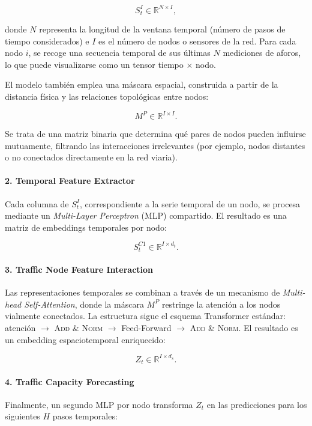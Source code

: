 \[
S_t^{I}\in\mathbb{R}^{N\times I},
\]

donde $N$ representa la longitud de la ventana temporal (número de pasos de tiempo considerados) e $I$ es el número de nodos o sensores de la red. Para cada nodo $i$, se recoge una secuencia temporal de sus últimas $N$ mediciones de aforos, lo que puede visualizarse como un tensor tiempo × nodo.

El modelo también emplea una máscara espacial, construida a partir de la distancia física y las relaciones topológicas entre nodos:

\[
M^{P}\in\mathbb{R}^{I\times I}.
\]

Se trata de una matriz binaria que determina qué pares de nodos pueden influirse mutuamente, filtrando las interacciones irrelevantes (por ejemplo, nodos distantes o no conectados directamente en la red viaria).

\paragraph*{2. Temporal Feature Extractor}  

Cada columna de $S_t^{I}$, correspondiente a la serie temporal de un nodo, se procesa mediante un \emph{Multi-Layer Perceptron} (MLP) compartido. El resultado es una matriz de embeddings temporales por nodo:

\[
S_t^{C1}\in\mathbb{R}^{I\times d_t}.
\]

\paragraph*{3. Traffic Node Feature Interaction}  

Las representaciones temporales se combinan a través de un mecanismo de \emph{Multi-head Self-Attention}, donde la máscara $M^{P}$ restringe la atención a los nodos vialmente conectados. La estructura sigue el esquema Transformer estándar: atención $\rightarrow$ \textsc{Add \& Norm} $\rightarrow$ Feed-Forward $\rightarrow$ \textsc{Add \& Norm}. El resultado es un embedding espaciotemporal enriquecido:

\[
Z_t\in\mathbb{R}^{I\times d_s}.
\]

\paragraph*{4. Traffic Capacity Forecasting}  

Finalmente, un segundo MLP por nodo transforma $Z_t$ en las predicciones para los siguientes $H$ pasos temporales:

